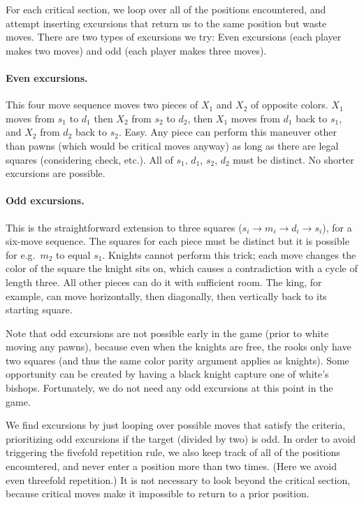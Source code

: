 \documentclass[twocolumn]{article}
\begin{document}
For each critical section, we loop over all of the positions
encountered, and attempt inserting excursions that return us to the
same position but waste moves. There are two types of excursions we
try: Even excursions (each player makes two moves) and odd (each
player makes three moves).

\paragraph{Even excursions.} This four move sequence moves two pieces
of $X_1$ and $X_2$ of opposite colors. $X_1$ moves from $s_1$ to $d_1$
then $X_2$ from $s_2$ to $d_2$, then $X_1$ moves from $d_1$ back to
$s_1$, and $X_2$ from $d_2$ back to $s_2$. Easy. Any piece can perform
this maneuver other than pawns (which would be critical moves anyway)
as long as there are legal squares (considering check, etc.). All of
$s_1$, $d_1$, $s_2$, $d_2$ must be distinct. No shorter excursions are
possible.

\paragraph{Odd excursions.} This is the straightforward extension to
three squares ($s_i \rightarrow m_i \rightarrow d_i \rightarrow s_i$),
for a six-move sequence. The squares for each piece must be distinct
but it is possible for e.g.~$m_2$ to equal $s_1$. Knights cannot
perform this trick; each move changes the color of the square the
knight sits on, which causes a contradiction with a cycle of length
three. All other pieces can do it with sufficient room. The king, for
example, can move horizontally, then diagonally, then vertically back
to its starting square.

Note that odd excursions are not possible early in the game (prior to
white moving any pawns), because even when the knights are free, the
rooks only have two squares (and thus the same color parity argument
applies as knights). Some opportunity can be created by having a black
knight capture one of white's bishops. Fortunately, we do not need any
odd excursions at this point in the game.

We find excursions by just looping over possible moves that satisfy
the criteria, prioritizing odd excursions if the target (divided by
two) is odd. In order to avoid triggering the fivefold repetition
rule, we also keep track of all of the positions encountered, and
never enter a position more than two times. (Here we avoid even
threefold repetition.) It is not necessary to look beyond the critical
section, because critical moves make it impossible to return to a
prior position.
\end{document}
